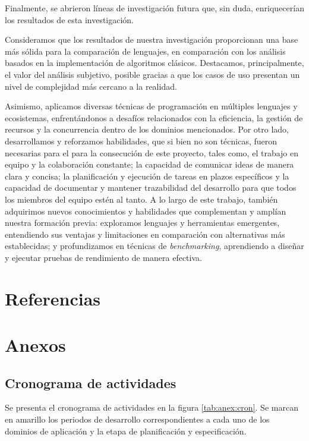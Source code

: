 \documentclass[11pt]{article}
\let\Oldsection\section
\renewcommand{\section}{\FloatBarrier\Oldsection}
\let\Oldsubsection\subsection
\renewcommand{\subsection}{\FloatBarrier\Oldsubsection}
\newcommand{\english}[1]{\textit{#1}}
\begin{document}
Finalmente, se abrieron líneas de investigación futura que, sin duda, enriquecerían los resultados de esta investigación.

Consideramos que los resultados de nuestra investigación proporcionan una base más sólida para la comparación de lenguajes, en comparación con los análisis basados en la implementación de algoritmos clásicos. Destacamos, principalmente, el valor del análisis subjetivo, posible gracias a que los casos de uso presentan un nivel de complejidad más cercano a la realidad.

Asimismo, aplicamos diversas técnicas de programación en múltiples lenguajes y ecosistemas, enfrentándonos a desafíos relacionados con la eficiencia, la gestión de recursos y la concurrencia dentro de los dominios mencionados. Por otro lado, desarrollamos y reforzamos habilidades, que si bien no son técnicas, fueron necesarias para el para la consecución de este proyecto, tales como, el trabajo en equipo y la colaboración constante; la capacidad de comunicar ideas de manera clara y concisa; la planificación y ejecución de tareas en plazos específicos y la capacidad de documentar y mantener trazabilidad del desarrollo para que todos los miembros del equipo estén al tanto. A lo largo de este trabajo, también adquirimos nuevos conocimientos y habilidades que complementan y amplían nuestra formación previa: exploramos lenguajes y herramientas emergentes, entendiendo sus ventajas y limitaciones en comparación con alternativas más establecidas; y profundizamos en técnicas de \english{benchmarking}, aprendiendo a diseñar y ejecutar pruebas de rendimiento de manera efectiva.

\newpage

\section{Referencias}

\begingroup
\raggedright
\printbibliography %
\endgroup

\section{Anexos}

\subsection{Cronograma de actividades}

Se presenta el cronograma de actividades en la figura \ref{tab:anex:cron}. Se marcan en amarillo los periodos de desarrollo correspondientes a cada uno de los dominios de aplicación y la etapa de planificación y especificación.
\end{document}
